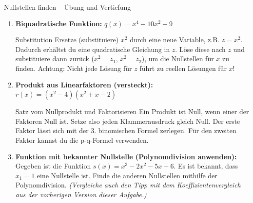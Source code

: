 \begin{aufgabenumgebung}{Nullstellen finden – Übung und Vertiefung}
\begin{enumerate}
    \item \textbf{Biquadratische Funktion:}
        $q(x) = x^4 - 10x^2 + 9$
        \begin{tippumgebung}{Substitution}
        Ersetze (substituiere) $x^2$ durch eine neue Variable, z.B. $z = x^2$. Dadurch erhältst du eine quadratische Gleichung in $z$. Löse diese nach $z$ und substituiere dann zurück ($x^2 = z_1$, $x^2 = z_2$), um die Nullstellen für $x$ zu finden. Achtung: Nicht jede Lösung für $z$ führt zu reellen Lösungen für $x$!
        \end{tippumgebung}

    \item \textbf{Produkt aus Linearfaktoren (versteckt):}
        $r(x) = (x^2-4)(x^2+x-2)$
        \begin{tippumgebung}{Satz vom Nullprodukt und Faktorisieren}
        Ein Produkt ist Null, wenn einer der Faktoren Null ist. Setze also jeden Klammerausdruck gleich Null. Der erste Faktor lässt sich mit der 3. binomischen Formel zerlegen. Für den zweiten Faktor kannst du die p-q-Formel verwenden.
        \end{tippumgebung}

    \item \textbf{Funktion mit bekannter Nullstelle (Polynomdivision anwenden):}
        Gegeben ist die Funktion $s(x) = x^3 - 2x^2 - 5x + 6$. Es ist bekannt, dass $x_1=1$ eine Nullstelle ist. Finde die anderen Nullstellen mithilfe der Polynomdivision.
        \textit{(Vergleiche auch den Tipp mit dem Koeffizientenvergleich aus der vorherigen Version dieser Aufgabe.)}


\end{enumerate}
\end{aufgabenumgebung}
